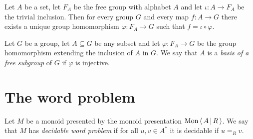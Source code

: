 \begin{lemma}\label{lem:universal_prop_free_group}
	Let $A$ be a set, let $F_A$ be the free group with alphabet $A$ and let $\iota: A\rightarrow F_A$ be the trivial
	inclusion. Then for every group $G$ and every map $f: A\rightarrow G$ there exists a unique group homomorphism
	$\varphi: F_A \rightarrow G$ such that $f = \iota \circ \varphi$.
\end{lemma}

\begin{definition}\label{def:free_basis}
	Let $G$ be a group, let $A\subseteq G$ be any subset and let $\varphi: F_A \rightarrow G$ be the group homomorphism
	extending the inclusion of $A$ in $G$. We say that $A$ is a \emph{basis of a free subgroup} of $G$ if $\varphi$ is
	injective.
\end{definition}

\section{The word problem}

\begin{definition}\label{def:WPdecidable}
	\rocqok{}
	Let $M$ be a monoid presented by the monoid presentation $\mathrm{Mon}\left\langle\, A \,\middle|\, R \,\right\rangle$. We say that $M$ has
	\emph{decidable word problem} if for all $u, v\in A^\ast$ it is decidable if $u =_R v$.
\end{definition}

